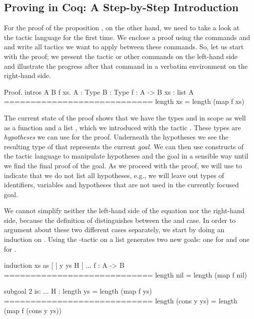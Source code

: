 \subsection{Proving in Coq: A Step-by-Step Introduction}
For the proof of the proposition , on the other hand, we need to take a look at the tactic language  for the first time.
We enclose a proof using the commands  and  and write all tactics we want to apply between these commands.
So, let us start with the proof; we present the tactic or other commands on the left-hand side and illustrate the progress after that command in a verbatim environment on the right-hand side.

\begin{cproof}{Proof. intros A B f xs.}
  A : Type
  B : Type
  f : A -> B
  xs : list A
  ============================
  length xs = length (map f xs)
\end{cproof}

The current state of the proof shows that we have the types  and  in scope as well as a function  and a list , which we introduced with the tactic .
These types are \emph{hypotheses} we can use for the proof.
Underneath the hypotheses we see the resulting type of  that represents the current \emph{goal}.
We can then use constructs of the tactic language to manipulate hypotheses and the goal in a sensible way until we find the final proof of the goal.
As we proceed with the proof, we will use  to indicate that we do not list all hypotheses, e.g., we will leave out types of identifiers, variables and hypotheses that are not used in the currently focused goal.

We cannot simplify neither the left-hand side of the equation nor the right-hand side, because the definition of  distinguishes between the  and  case.
In order to argument about these two different cases separately, we start by doing an induction on .
Using the -tactic on a list generates two new goals: one for  and one for .

\begin{cproof}{induction xs as [ | y ys H ]}
  ...
  f : A -> B
  ============================
  length nil = length (map f nil)

subgoal 2 is:
  ...
  H : length ys = length (map f ys)
  ============================
  length (cons y ys) =
  length (map f (cons y ys))
\end{cproof}


